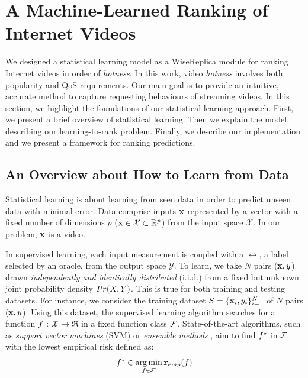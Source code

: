 \section{A Machine-Learned Ranking of Internet Videos}
\label{sec:learning_model}

We designed a statistical learning model as a WiseReplica module for ranking Internet videos in order of \emph{hotness}. In this work, video \emph{hotness} involves both popularity and QoS requirements. Our main goal is to provide an intuitive, accurate method to capture requesting behaviours of streaming videos. In this section, we highlight the foundations of our statistical learning approach. First, we present a brief overview of statistical learning. Then we explain the model, describing our learning-to-rank problem. Finally, we describe our implementation and we present a framework for ranking predictions.

\subsection{An Overview about How to Learn from Data}
\label{subsec:learning_model_overview}

Statistical learning is about learning from seen data in order to predict unseen data with minimal error. Data comprise inputs ${\bf x}$ represented by a vector with a fixed
  number of dimensions $p$ (${\bf x} \in {\cal X} \subset \mathbb{R}^p$) from the input space $\mathcal{X}$. In our problem, ${\bf x}$ is a video. 

In supervised learning, each input measurement is coupled with a $\rel$, a label selected by an oracle, from the output space $\mathcal{Y}$. To learn, we take $N$ pairs (${\bf x},y$) drawn \emph{independently and identically distributed} (i.i.d.) from a fixed but unknown joint probability density ${Pr(X,Y)}$. This is true  for both training and testing datasets. For instance, we consider the training dataset  $S = \{{\bf x}_i,y_i\}_{i=1}^N$ of $N$ pairs (${\bf x},y$). Using this dataset, the supervised learning algorithm searches for a function $f$ : $\mathcal{X} \rightarrow \Re$  in a fixed function class ${\cal F}$. State-of-the-art algorithms, such as \emph{support vector machines} (\textsc{SVM}) \cite{svm_1995} or \emph{ensemble methods} \cite{elements_of_statistical_learning_2001}, aim to find $f^\star$ in ${\cal F}$ with the lowest empirical risk defined as:
\begin{equation}
\label{eq:erm}
f^\star \in \operatorname*{arg\,min}_{f \in {\cal F}} {\tt r}_{emp}(f)
\end{equation}

